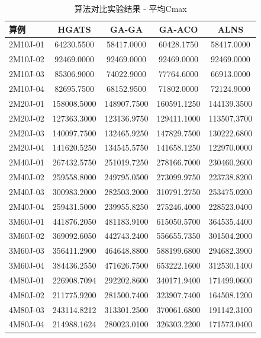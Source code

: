 \begin{table}[htbp]
\centering
\caption{算法对比实验结果 - 平均Cmax}
\begin{tabular}{l|cccc}
\hline
算例 & HGATS & GA-GA & GA-ACO & ALNS \\
\hline
2M10J-01 & 64230.5500 & 58417.0000 & 60428.1750 & 58417.0000 \\
2M10J-02 & 92469.0000 & 92469.0000 & 92469.0000 & 92469.0000 \\
2M10J-03 & 85306.9000 & 74022.9000 & 77764.6000 & 66913.0000 \\
2M10J-04 & 82695.7500 & 68152.9500 & 71802.0000 & 72124.9000 \\
2M20J-01 & 158008.5000 & 148907.7500 & 160591.1250 & 144139.3500 \\
2M20J-02 & 127363.3000 & 123136.9750 & 129411.1000 & 113507.3700 \\
2M20J-03 & 140097.7500 & 132465.9250 & 147829.7500 & 130222.6800 \\
2M20J-04 & 141620.5250 & 134545.5750 & 141658.1250 & 122970.0000 \\
2M40J-01 & 267432.5750 & 251019.7250 & 278166.7000 & 230460.2600 \\
2M40J-02 & 259558.8000 & 249795.0500 & 273099.9750 & 223738.8200 \\
2M40J-03 & 300983.2000 & 282503.2000 & 310791.2750 & 253475.0200 \\
2M40J-04 & 259431.5000 & 239955.8250 & 275246.4000 & 228523.0400 \\
3M60J-01 & 441876.2050 & 481183.9100 & 615050.5700 & 364535.4400 \\
3M60J-02 & 369092.6050 & 442743.2400 & 556655.7350 & 301504.2000 \\
3M60J-03 & 356411.2900 & 464648.8800 & 588199.6800 & 294682.3900 \\
3M60J-04 & 384436.2550 & 471626.7500 & 653222.1600 & 312530.1400 \\
4M80J-01 & 226908.7094 & 292202.8600 & 340171.9400 & 171499.0600 \\
4M80J-02 & 211775.9200 & 281500.7400 & 323907.7400 & 164508.1200 \\
4M80J-03 & 243114.8212 & 313301.2500 & 370061.6800 & 191142.3100 \\
4M80J-04 & 214988.1624 & 280023.0100 & 326303.2200 & 171573.0400 \\
\hline
\end{tabular}
\end{table}

